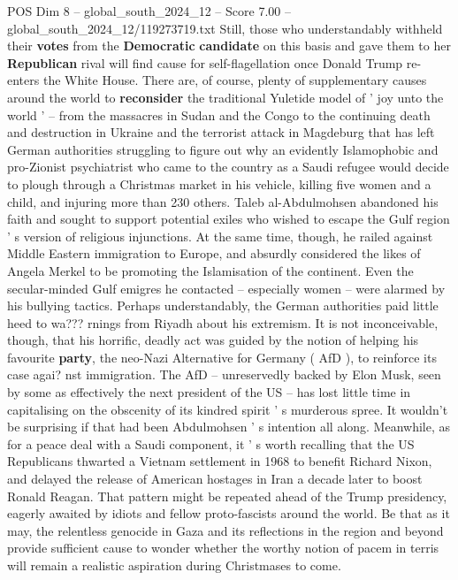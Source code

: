 \begin{textsample}{POS Dim 8 – global\_south\_2024\_12 – Score 7.00 – global\_south\_2024\_12/119273719.txt}
Still, those who understandably withheld their \textbf{votes} from the \textbf{Democratic} \textbf{candidate} on this basis and gave them to her \textbf{Republican} rival will find cause for self-flagellation once Donald Trump re-enters the White House.
There are, of course, plenty of supplementary causes around the world to \textbf{reconsider} the traditional Yuletide model of ' joy unto the world ' -- from the massacres in Sudan and the Congo to the continuing death and destruction in Ukraine and the terrorist attack in Magdeburg that has left German authorities struggling to figure out why an evidently Islamophobic and pro-Zionist psychiatrist who came to the country as a Saudi refugee would decide to plough through a Christmas market in his vehicle, killing five women and a child, and injuring more than 230 others.
Taleb al-Abdulmohsen abandoned his faith and sought to support potential exiles who wished to escape the Gulf region ' s version of religious injunctions.
At the same time, though, he railed against Middle Eastern immigration to Europe, and absurdly considered the likes of Angela Merkel to be promoting the Islamisation of the continent.
Even the secular-minded Gulf emigres he contacted -- especially women -- were alarmed by his bullying tactics.
Perhaps understandably, the German authorities paid little heed to wa??? rnings from Riyadh about his extremism.
It is not inconceivable, though, that his horrific, deadly act was guided by the notion of helping his favourite \textbf{party}, the neo-Nazi Alternative for Germany ( AfD ), to reinforce its case agai? nst immigration.
The AfD -- unreservedly backed by Elon Musk, seen by some as effectively the next president of the US -- has lost little time in capitalising on the obscenity of its kindred spirit ' s murderous spree.
It wouldn't be surprising if that had been Abdulmohsen ' s intention all along.
Meanwhile, as for a peace deal with a Saudi component, it ' s worth recalling that the US Republicans thwarted a Vietnam settlement in 1968 to benefit Richard Nixon, and delayed the release of American hostages in Iran a decade later to boost Ronald Reagan.
That pattern might be repeated ahead of the Trump presidency, eagerly awaited by idiots and fellow proto-fascists around the world.
Be that as it may, the relentless genocide in Gaza and its reflections in the region and beyond provide sufficient cause to wonder whether the worthy notion of pacem in terris will remain a realistic aspiration during Christmases to come.

\end{textsample}
